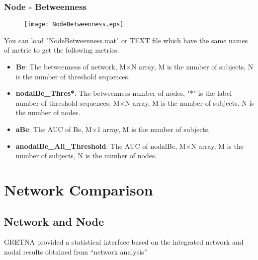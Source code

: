 \documentclass[11pt]{article}
\begin{document}
			\subsubsection{Node - Betweenness}
				\begin{figure}
					\begin{center}
						\texttt{[image: NodeBetweenness.eps]}
					\end{center}
				\end{figure}
				You can load "NodeBetweenness.mat" or TEXT file which have the same names of metric to get the following metrics.
				\begin{itemize}
					\item \textbf{Be}: The betweenness of network,
						M$\times$N array, M is the number of subjects, N is the number of threshold sequences.
					\item \textbf{nodalBe\_Thres*}: The betweenness number of nodes, "*" is the label number of threshold sequences,
						M$\times$N array, M is the number of subjects, N is the number of nodes.
					\item \textbf{aBe}: The AUC of Be,
						M$\times$1 array, M is the number of subjects.
					\item \textbf{anodalBe\_All\_Threshold}: The AUC of nodalBe,
						M$\times$N array, M is the number of subjects, N is the number of nodes.
				\end{itemize}
    \section{Network Comparison}
        \subsection{Network and Node}
            GRETNA provided a statistical interface based on the integrated
            network and nodal results obtained from ``network analysis''
\end{document}

